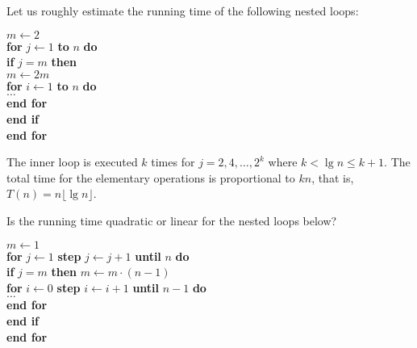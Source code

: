 \begin{Boxample}[6]
\label{exm:nest2}
Let us roughly estimate the running time of the following nested loops:
 
\hspace*{.3in}\begin{minipage}{5in}
\Algorbody
{
\(m \leftarrow 2\) \\
\textbf{for} \(j \leftarrow 1\) \textbf{to} \(n\) \textbf{do}\\
\>\textbf{if} \(j = m \) \textbf{then} \\
\>\> \(m \leftarrow 2m\) \\
\>\>\textbf{for} \(i \leftarrow  1\) \textbf{to} \(n\) \textbf{do}\\
\>\>\>$\ldots$  \\
\>\>\textbf{end for} \\
\>\textbf{end if}\\
\textbf{end for}\\
}
\end{minipage}

The inner loop is executed $k$ times for $j=2, 4, \ldots, 2^{k}$
where $k < \lg n \le k+1$. The total time for the elementary operations is 
proportional to $kn$, that is, $T(n)=  n  \lfloor \lg n \rfloor$.    
\end{Boxample}

\begin{Boxample}[6]
\label{exm:nest1}
Is the running time quadratic or linear for the nested loops below?\\

\begin{minipage}{5in}
\Algorbody
{
\(m \leftarrow 1\) \\
\textbf{for} \(j \leftarrow 1\) \textbf{step} \(j \leftarrow j+1\) 
                                    \textbf{until} \(n\) \textbf{do}\\
\>\textbf{if} \(j = m \) \textbf{then} \(m \leftarrow m \cdot (n-1)\) \\
\>\>\textbf{for} \(i \leftarrow  0\) \textbf{step} \(i \leftarrow i+1\) 
                                       \textbf{until} \(n-1\) \textbf{do}\\
\>\>\>$\ldots$  \\
\>\>\textbf{end for} \\
\>\textbf{end if}\\
\textbf{end for} \\
}
\end{minipage}

\end{Boxample}



